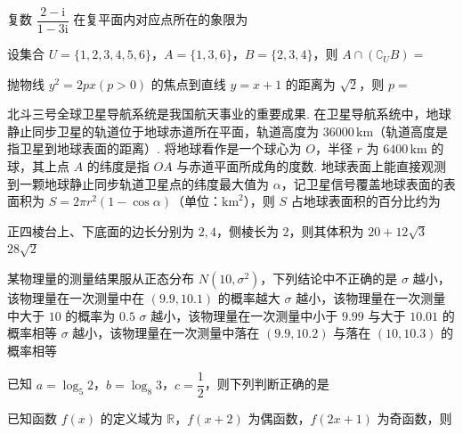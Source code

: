 \documentclass[a4paper,11pt]{report}
\begin{document}
\begin{examquestions}

\item 复数 $\dfrac{2-\mathrm{i}}{1-3\mathrm{i}}$ 在复平面内对应点所在的象限为

\item 设集合 $U=\{1,2,3,4,5,6\}$，$A=\{1,3,6\}$，$B=\{2,3,4\}$，则 $A\cap(\complement_U B)=$

\item 抛物线 $y^2=2px(p>0)$ 的焦点到直线 $y=x+1$ 的距离为 $\sqrt2$，则 $p=$

\item 北斗三号全球卫星导航系统是我国航天事业的重要成果. 在卫星导航系统中，地球静止同步卫星的轨道位于地球赤道所在平面，轨道高度为 $36000\,\mathrm{km}$（轨道高度是指卫星到地球表面的距离）. 将地球看作是一个球心为 $O$，半径 $r$ 为 $6400\,\mathrm{km}$ 的球，其上点 $A$ 的纬度是指 $OA$ 与赤道平面所成角的度数. 地球表面上能直接观测到一颗地球静止同步轨道卫星点的纬度最大值为 $\alpha$，记卫星信号覆盖地球表面的表面积为 $S=2\pi r^2(1-\cos\alpha)$（单位：$\mathrm{km}^2$），则 $S$ 占地球表面积的百分比约为

\item 正四棱台上、下底面的边长分别为 $2,4$，侧棱长为 $2$，则其体积为
\fourchoices
{$20+12\sqrt3$}
{$28\sqrt2$}
{}
{}

\item 某物理量的测量结果服从正态分布 $N(10,\sigma^2)$，下列结论中不正确的是
\onechoices
{$\sigma$ 越小，该物理量在一次测量中在 $(9.9,10.1)$ 的概率越大}
{$\sigma$ 越小，该物理量在一次测量中大于 $10$ 的概率为 $0.5$}
{$\sigma$ 越小，该物理量在一次测量中小于 $9.99$ 与大于 $10.01$ 的概率相等}
{$\sigma$ 越小，该物理量在一次测量中落在 $(9.9,10.2)$ 与落在 $(10,10.3)$ 的概率相等}

\item 已知 $a=\log_5 2$，$b=\log_8 3$，$c=\dfrac12$，则下列判断正确的是

\item 已知函数 $f(x)$ 的定义域为 $\mathbb R$，$f(x+2)$ 为偶函数，$f(2x+1)$ 为奇函数，则

\end{examquestions}
\end{document}

